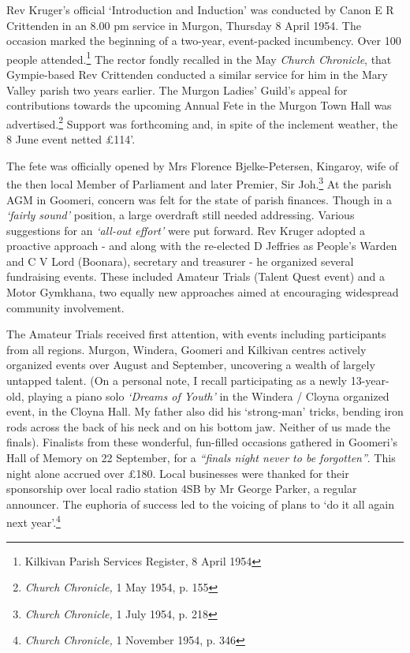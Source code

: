 Rev Kruger's official `Introduction and Induction' was conducted by Canon E R Crittenden in an 8.00 pm service in Murgon, Thursday 8 April 1954. The occasion marked the beginning of a two-year, event-packed incumbency. Over 100 people attended.\footnote{Kilkivan Parish Services Register, 8 April 1954} The rector fondly recalled in the May \emph{Church Chronicle}, that Gympie-based Rev Crittenden conducted a similar service for him in the Mary Valley parish two years earlier. The Murgon Ladies' Guild's appeal for contributions towards the upcoming Annual Fete in the Murgon Town Hall was advertised.\footnote{\emph{Church Chronicle,} 1 May 1954, p. 155} Support was forthcoming and, in spite of the inclement weather, the 8 June event netted \pounds114'.


The fete was officially opened by Mrs Florence Bjelke-Petersen, Kingaroy, wife of the then local Member of Parliament and later Premier, Sir Joh.\footnote{\emph{Church Chronicle,} 1 July 1954, p. 218} At the parish AGM in Goomeri, concern was felt for the state of parish finances. Though in a \emph{`fairly sound'} position, a large overdraft still needed addressing. Various suggestions for an \emph{`all-out effort'} were put forward. Rev Kruger adopted a proactive approach - and along with the re-elected D Jeffries as People's Warden and C V Lord (Boonara), secretary and treasurer - he organized several fundraising events. These included Amateur Trials (Talent Quest event) and a Motor Gymkhana, two equally new approaches aimed at encouraging widespread community involvement.


The Amateur Trials received first attention, with events including participants from all regions. Murgon, Windera, Goomeri and Kilkivan centres actively organized events over August and September, uncovering a wealth of largely untapped talent. (On a personal note, I recall participating as a newly 13-year-old, playing a piano solo \emph{`Dreams of Youth'} in the Windera / Cloyna organized event, in the Cloyna Hall. My father also did his `strong-man' tricks, bending iron rods across the back of his neck and on his bottom jaw. Neither of us made the finals). Finalists from these wonderful, fun-filled occasions gathered in Goomeri's Hall of Memory on 22 September, for a \emph{``finals night never to be forgotten''}. This night alone accrued over \pounds180. Local businesses were thanked for their sponsorship over local radio station 4SB by Mr George Parker, a regular announcer. The euphoria of success led to the voicing of plans to `do it all again next year'.\footnote{\emph{Church Chronicle,} 1 November 1954, p. 346}


